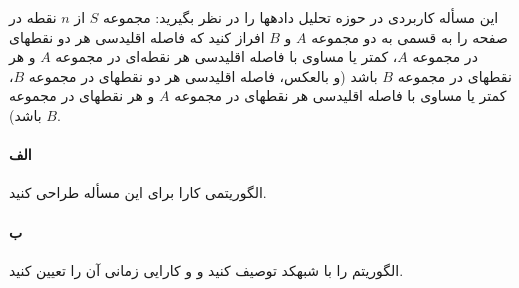 \documentclass[]{article}
\begin{document}
این مسأله کاربردی در حوزه تحلیل دادهها را در نظر بگیرید:
مجموعه $S$ از $n$ نقطه در صفحه را به قسمی به دو مجموعه $A$ و $B$ افراز کنید
که فاصله اقلیدسی هر دو نقطهای در مجموعه $A$،
کمتر یا مساوی با فاصله اقلیدسی هر نقطه‌ای در مجموعه $A$ و هر نقطهای در مجموعه $B$ باشد
(و بالعکس، فاصله اقلیدسی هر دو نقطهای در مجموعه $B$، 
کمتر یا مساوی با فاصله اقلیدسی هر نقطهای در مجموعه $A$ و هر نقطهای در مجموعه $B$ باشد).

\paragraph*{الف}
الگوریتمی کارا برای این مسأله طراحی کنید.

\paragraph*{ب}
الگوریتم را با شبهکد توصیف کنید و و کارایی زمانی آن را تعیین کنید.
\end{document}
